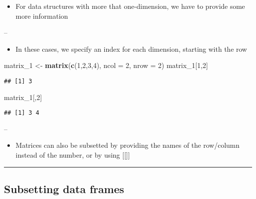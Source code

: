 \documentclass[]{article}
\newenvironment{Shaded}{\begin{snugshade}}{\end{snugshade}}
\newcommand{\DataTypeTok}[1]{\textcolor[rgb]{0.13,0.29,0.53}{#1}}
\newcommand{\DecValTok}[1]{\textcolor[rgb]{0.00,0.00,0.81}{#1}}
\newcommand{\KeywordTok}[1]{\textcolor[rgb]{0.13,0.29,0.53}{\textbf{#1}}}
\newcommand{\NormalTok}[1]{#1}
\newcommand{\StringTok}[1]{\textcolor[rgb]{0.31,0.60,0.02}{#1}}
\providecommand{\tightlist}{%
  \setlength{\itemsep}{0pt}\setlength{\parskip}{0pt}}
\begin{document}
\begin{itemize}
\tightlist
\item
  For data structures with more that one-dimension, we have to provide
  some more information
\end{itemize}

--

\begin{itemize}
\tightlist
\item
  In these cases, we specify an index for each dimension, starting with
  the row
\end{itemize}

\begin{Shaded}
\begin{Highlighting}[]
\NormalTok{matrix_}\DecValTok{1}\NormalTok{ <-}\StringTok{ }\KeywordTok{matrix}\NormalTok{(}\KeywordTok{c}\NormalTok{(}\DecValTok{1}\NormalTok{,}\DecValTok{2}\NormalTok{,}\DecValTok{3}\NormalTok{,}\DecValTok{4}\NormalTok{), }\DataTypeTok{ncol =} \DecValTok{2}\NormalTok{, }\DataTypeTok{nrow =} \DecValTok{2}\NormalTok{)}
\NormalTok{matrix_}\DecValTok{1}\NormalTok{[}\DecValTok{1}\NormalTok{,}\DecValTok{2}\NormalTok{]}
\end{Highlighting}
\end{Shaded}

\begin{verbatim}
## [1] 3
\end{verbatim}

\begin{Shaded}
\begin{Highlighting}[]
\NormalTok{matrix_}\DecValTok{1}\NormalTok{[,}\DecValTok{2}\NormalTok{]}
\end{Highlighting}
\end{Shaded}

\begin{verbatim}
## [1] 3 4
\end{verbatim}

--

\begin{itemize}
\tightlist
\item
  Matrices can also be subsetted by providing the names of the
  row/column instead of the number, or by using {[}{[}{]}{]}
\end{itemize}

\begin{center}\rule{0.5\linewidth}{\linethickness}\end{center}

\hypertarget{subsetting-data-frames}{%
\subsection{Subsetting data frames}\label{subsetting-data-frames}}
\end{document}
